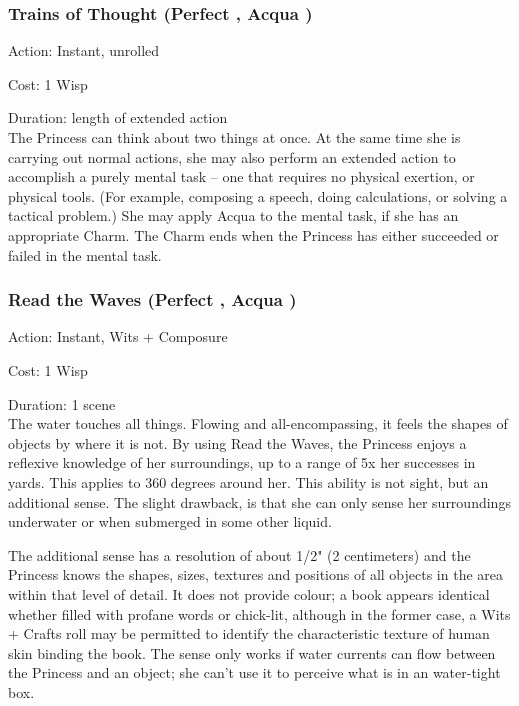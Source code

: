\subsubsection*{Trains of Thought (Perfect \textbullet, Acqua \textbullet)}

\noindent Action: Instant, unrolled

\noindent Cost: 1 Wisp

\noindent Duration: length of extended action\\

\noindent The Princess can think about two things at once. At the same time she is carrying out normal actions, she may also perform an extended action to accomplish a purely mental task -- one that requires no physical exertion, or physical tools. (For example, composing a speech, doing calculations, or solving a tactical problem.) She may apply Acqua to the mental task, if she has an appropriate Charm. The Charm ends when the Princess has either succeeded or failed in the mental task.

\subsubsection*{Read the Waves (Perfect \textbullet, Acqua \textbullet)}

\noindent Action: Instant, Wits + Composure

\noindent Cost: 1 Wisp

\noindent Duration: 1 scene \\

\noindent The water touches all things. Flowing and all-encompassing, it feels the shapes of objects by where it is not. By using Read the Waves, the Princess enjoys a reflexive knowledge of her surroundings, up to a range of 5x her successes in yards. This applies to 360 degrees around her. This ability is not sight, but an additional sense. The slight drawback, is that she can only sense her surroundings underwater or when submerged in some other liquid. 

The additional sense has a resolution of about 1/2" (2 centimeters) and the Princess knows the shapes, sizes, textures and positions of all objects in the area within that level of detail. It does not provide colour; a book appears identical whether filled with profane words or chick-lit, although in the former case, a Wits + Crafts roll may be permitted to identify the characteristic texture of human skin binding the book. The sense only works if water currents can flow between the Princess and an object; she can't use it to perceive what is in an water-tight box. 

